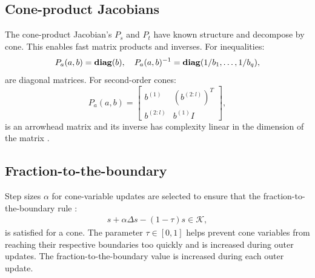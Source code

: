 \subsection{Cone-product Jacobians} \label{calipso_cone_product_jacobians}
The cone-product Jacobian's $P_s$ and $P_t$ have known structure and decompose by cone. This enables fast matrix products and inverses. For inequalities: 
\begin{equation} 
	P_a(a, b) = \mbox{\textbf{diag}}(b), \quad P_a(a, b)^{-1} = \mbox{\textbf{diag}}(1 / b_1, \dots, 1 / b_q),
\end{equation} 
are diagonal matrices. For second-order cones:
\begin{equation} 
	P_a(a, b) = \begin{bmatrix} b^{(1)} & (b^{(2:l)})^T \\ b^{(2:l)} & b^{(1)} I \end{bmatrix},
\end{equation} 
is an arrowhead matrix and its inverse has complexity linear in the dimension of the matrix \cite{najafi2014efficient}.

\subsection{Fraction-to-the-boundary} \label{calipso_f2b} 
Step sizes $\alpha$ for cone-variable updates are selected to ensure that the fraction-to-the-boundary rule \cite{wachter2006implementation}:
\begin{align}
	s + \alpha \Delta s - (1 - \tau) s \in \mathcal{K}, \label{calipso_fraction_to_boundary}
\end{align}
is satisfied for a cone. The parameter $\tau \in [0, 1]$ helps prevent cone variables from reaching their respective boundaries too quickly and is increased during outer updates. The fraction-to-the-boundary value is increased during each outer update.

